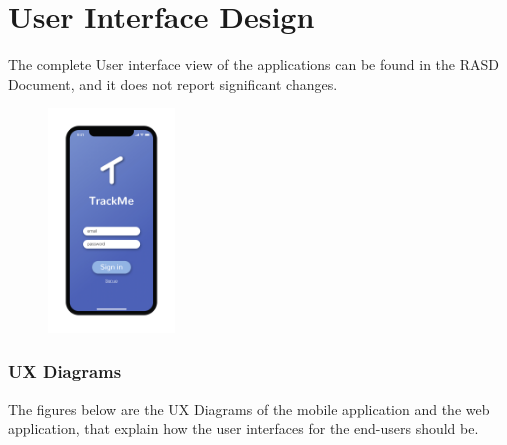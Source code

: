 \chapter{User Interface Design}
The complete User interface view of the applications can be found in the RASD Document, and it does not report significant changes.
\begin{figure}[H]
    \centering
   
\end{figure}
\begin{figure}[H]
    \centering
    \includegraphics[width=0.30\textwidth]{./Pictures/Mockup/mobile/login.png}
    
\end{figure}


\subsection{UX Diagrams}
The figures below are the UX Diagrams of the mobile application and the web application, that explain how the user interfaces for the end-users should be.


